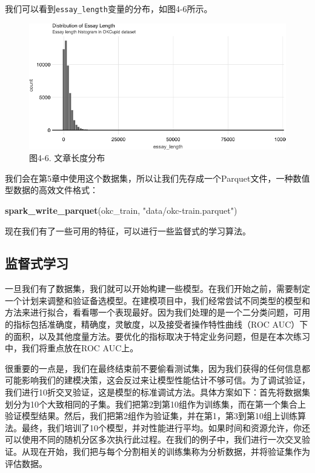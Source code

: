 \documentclass[
]{article}
\newenvironment{Shaded}{\begin{snugshade}}{\end{snugshade}}
\newcommand{\KeywordTok}[1]{\textcolor[rgb]{0.13,0.29,0.53}{\textbf{#1}}}
\newcommand{\NormalTok}[1]{#1}
\newcommand{\StringTok}[1]{\textcolor[rgb]{0.31,0.60,0.02}{#1}}
\begin{document}
我们可以看到\texttt{essay\_length}变量的分布，如图4-6所示。

\begin{figure}
\centering
\includegraphics{figures/4_6.png}
\caption{图4-6. 文章长度分布}
\end{figure}

我们会在第5章中使用这个数据集，所以让我们先存成一个Parquet文件，一种数值型数据的高效文件格式：

\begin{Shaded}
\begin{Highlighting}[]
\KeywordTok{spark_write_parquet}\NormalTok{(okc_train, }\StringTok{"data/okc-train.parquet"}\NormalTok{)}
\end{Highlighting}
\end{Shaded}

现在我们有了一些可用的特征，可以进行一些监督式的学习算法。

\hypertarget{ux76d1ux7763ux5f0fux5b66ux4e60}{%
\subsection{监督式学习}\label{ux76d1ux7763ux5f0fux5b66ux4e60}}

一旦我们有了数据集，我们就可以开始构建一些模型。在我们开始之前，需要制定一个计划来调整和验证备选模型。在建模项目中，我们经常尝试不同类型的模型和方法来进行拟合，看看哪一个表现最好。因为我们处理的是一个二分类问题，可用的指标包括准确度，精确度，灵敏度，以及接受者操作特性曲线（ROC
AUC）下的面积，以及其他度量方法。要优化的指标取决于特定业务问题，但是在本次练习中，我们将重点放在ROC
AUC上。

很重要的一点是，我们在最终结束前不要偷看测试集，因为我们获得的任何信息都可能影响我们的建模决策，这会反过来让模型性能估计不够可信。为了调试验证，我们进行10折交叉验证，这是模型的标准调试方法。具体方案如下：首先将数据集划分为10个大致相同的子集。我们把第2到第10组作为训练集，而在第一个集合上验证模型结果。然后，我们把第2组作为验证集，并在第1，第3到第10组上训练算法。最终，我们培训了10个模型，并对性能进行平均。如果时间和资源允许，你还可以使用不同的随机分区多次执行此过程。在我们的例子中，我们进行一次交叉验证。从现在开始，我们把与每个分割相关的训练集称为分析数据，并将验证集作为评估数据。
\end{document}
